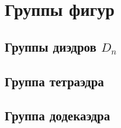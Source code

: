 \section{Группы фигур}
\subsection{Группы диэдров $D_n$}
\subsection{Группа тетраэдра}
\subsection{Группа додекаэдра}
